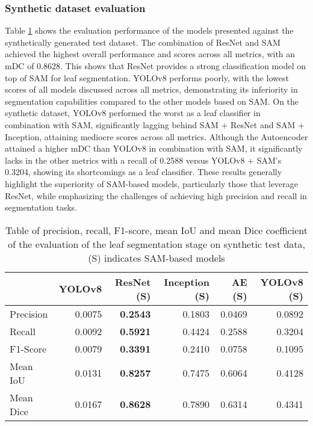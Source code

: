 \documentclass[draft,final]{vutinfth} %
\begin{document}
\subsubsection{Synthetic dataset evaluation}
Table \ref{tab:metrics_segmentation_synthetic} shows the evaluation performance of the models presented against the synthetically generated test dataset. 
The combination of ResNet and SAM achieved the highest overall performance and scores across all metrics, with an mDC of 0.8628. This shows that ResNet provides a strong classification model on top of SAM for leaf segmentation.
YOLOv8 performs poorly, with the lowest scores of all models discussed across all metrics, demonstrating its inferiority in segmentation capabilities compared to the other models based on SAM.
On the synthetic dataset, YOLOv8 performed the worst as a leaf classifier in combination with SAM, significantly lagging behind SAM + ResNet and SAM + Inception, attaining mediocre scores across all metrics.
Although the Autoencoder attained a higher mDC than YOLOv8 in combination with SAM, it significantly lacks in the other metrics with a recall of 0.2588 versus YOLOv8 + SAM's 0.3204, showing its shortcomings as a leaf classifier. 
These results generally highlight the superiority of SAM-based models, particularly those that leverage ResNet, while emphasizing the challenges of achieving high precision and recall in segmentation tasks.

\begin{table}[]
    \centering
    \begin{tabular}{lrrrrr}
    \toprule
     & YOLOv8 & ResNet (S) & Inception (S) & AE (S) & YOLOv8 (S) \\
    \midrule
    Precision & 0.0075 & \textbf{0.2543} & 0.1803 & 0.0469 & 0.0892 \\
    Recall & 0.0092 & \textbf{0.5921} & 0.4424 & 0.2588 & 0.3204 \\
    F1-Score & 0.0079 & \textbf{0.3391} & 0.2410 & 0.0758 & 0.1095 \\
    Mean IoU & 0.0131 & \textbf{0.8257} & 0.7475 & 0.6064 & 0.4128 \\
    Mean Dice & 0.0167 & \textbf{0.8628} & 0.7890 & 0.6314 & 0.4341 \\
    \bottomrule
    \end{tabular}
    \caption{Table of precision, recall, F1-score, mean IoU and mean Dice coefficient of the evaluation of the leaf segmentation stage on synthetic test data, (S) indicates SAM-based models}
    \label{tab:metrics_segmentation_synthetic}
\end{table}
\end{document}
